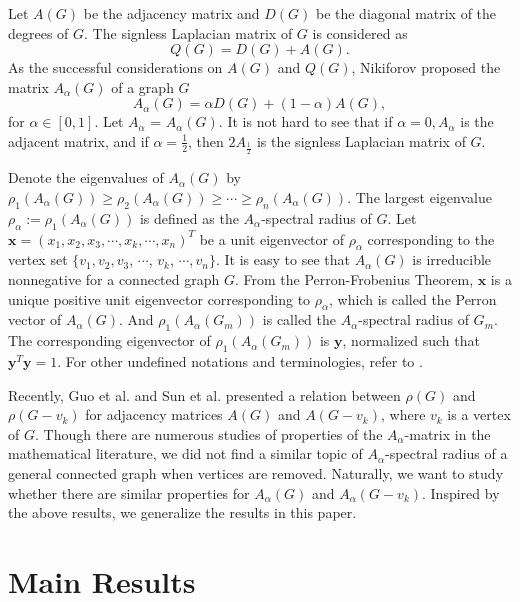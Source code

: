 \documentclass[amsthm]{elsart}
\begin{document}
\qquad  Let $A(G)$ be the adjacency matrix and $D(G)$ be the diagonal matrix of the degrees of $G$. The signless Laplacian matrix of $G$ is considered as $$Q(G) = D(G)+ A(G).$$ As the successful considerations on $A(G)$ and $Q(G)$,  Nikiforov \cite{2016Merging} proposed the matrix  $A_{\alpha}(G)$  of a graph $G$ $$A_{\alpha}(G) = \alpha D(G) +(1-\alpha)A(G),$$ for $\alpha \in [0,1]$.  Let $A_\alpha$ = $A_\alpha(G)$. It is not hard to see that if $\alpha =0, A_{\alpha}$ is the adjacent matrix, and if $\alpha = \frac{1}{2}$, then $2A_{\frac{1}{2}}$ is the signless Laplacian matrix of $G$.

\par \qquad  Denote  the eigenvalues of $A_{\alpha}(G)$ by $\rho_1(A_{\alpha}(G)) \geqslant \rho_2(A_{\alpha}(G)) \geqslant \cdots \geqslant \rho_n(A_{\alpha}(G))$. The largest eigenvalue $\rho_\alpha := \rho_1(A_{\alpha}(G))$ is defined as the $A_{\alpha}$-spectral radius of $G$.
 Let  $\textbf{x} = (x_1, x_2,x_3, \cdots,x_k, \cdots, x_n)^T$ be a unit eigenvector of $\rho_\alpha$ corresponding to  the  vertex set $\{v_1, v_2,v_3$, $\cdots$, $v_k$, $\cdots, v_n\}$.
  It is easy to see that $A_\alpha(G)$ is irreducible nonnegative for a connected graph $G$. From the Perron-Frobenius Theorem, $\textbf{x}$ is a unique positive unit eigenvector corresponding to $\rho_\alpha$, which is called the Perron vector of $A_\alpha(G)$.
And $\rho_1(A_\alpha(G_m))$ is called the $A_\alpha$-spectral radius of $G_m$.
The corresponding eigenvector of $\rho_1(A_\alpha(G_m))$ is
$\textbf{y}$, normalized such that $\textbf{y}^{T} \textbf{y} = 1$.
For other undefined notations and terminologies, refer to \cite{2001Introduction}.



\qquad Recently, Guo et al. \cite{2019Sharp} and Sun et al. \cite{2019A} presented a relation between $\rho(G)$ and $\rho(G- v_k)$ for adjacency matrices $A(G)$ and $A(G- v_k)$, where $v_k$ is a vertex of $G$. Though there are numerous studies of properties of
the $A_\alpha$-matrix in the mathematical literature, we did not find a similar topic of $A_\alpha$-spectral radius of a general connected graph when vertices are removed.  Naturally, we want to study whether there are similar properties for $A_\alpha(G)$ and $A_\alpha(G-v_k)$. Inspired by the above results, we generalize the  results in this paper.



\section{Main Results}
\end{document}
